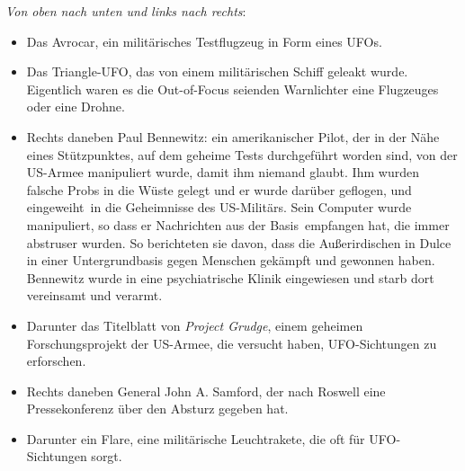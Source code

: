 \documentclass{scrartcl}
\begin{document}
\textit{Von oben nach unten und links nach rechts}:

\begin{itemize}
	\item Das Avrocar, ein militärisches Testflugzeug in Form eines UFOs. 
	\item Das Triangle-UFO, das von einem militärischen Schiff geleakt wurde. Eigentlich waren es die Out-of-Focus seienden Warnlichter eine Flugzeuges oder eine Drohne. 
	\item Rechts daneben Paul Bennewitz: ein amerikanischer Pilot, der in der Nähe eines Stützpunktes, auf dem geheime Tests durchgeführt worden sind, von der US-Armee manipuliert wurde, damit ihm niemand glaubt. Ihm wurden falsche Probs in die Wüste gelegt und er wurde darüber geflogen, und \frq eingeweiht\flq\ in die Geheimnisse des US-Militärs. Sein Computer wurde manipuliert, so dass er Nachrichten \frq aus der Basis\flq\ empfangen hat, die immer abstruser wurden. So berichteten sie davon, dass die Außerirdischen in Dulce in einer Untergrundbasis gegen Menschen gekämpft und gewonnen haben. Bennewitz wurde in eine psychiatrische Klinik eingewiesen und starb dort vereinsamt und verarmt.

	\item Darunter das Titelblatt von \textit{Project Grudge}, einem geheimen Forschungsprojekt der US-Armee, die versucht haben, UFO-Sichtungen zu erforschen. 
	\item Rechts daneben General John A. Samford, der nach Roswell eine Pressekonferenz über den Absturz gegeben hat. 
	\item Darunter ein Flare, eine militärische Leuchtrakete, die oft für UFO-Sichtungen sorgt. 
\end{itemize}
\end{document}

